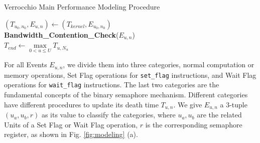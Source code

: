 \begin{algorithm}[tbp]
    \caption{Verrocchio Main Performance Modeling Procedure}
    \label{alg:model}
    
    
        
    \BlankLine

    $(T_{u_{0}, n_{0}}, E_{u, n}) \leftarrow (T_{kernel}, E_{u_{0}, n_{0}})$ \\
    \textbf{Bandwidth\_Contention\_Check}($E_{u, n}$) \\
    $T_{end} \leftarrow \max\limits_{0 < u \leq U}T_{u, N_{u}}$    
\end{algorithm}

For all Events $E_{u, n}$, we divide them into three categories, normal computation or memory operations, Set Flag operations for \verb|set_flag| instructions, and Wait Flag operations for \verb|wait_flag| instructions. The last two categories are the fundamental concepts of the binary semaphore mechanism. Different categories have different procedures to update its death time $T_{u, n}$. We give $E_{u, n}$ a 3-tuple $(u_{a}, u_{b}, r)$ as its value to classify the categories, where $u_{a}, u_{b}$ are the related Units of a Set Flag or Wait Flag operation, $r$ is the corresponding semaphore register, as shown in Fig. \ref{fig:modeling} (a).

